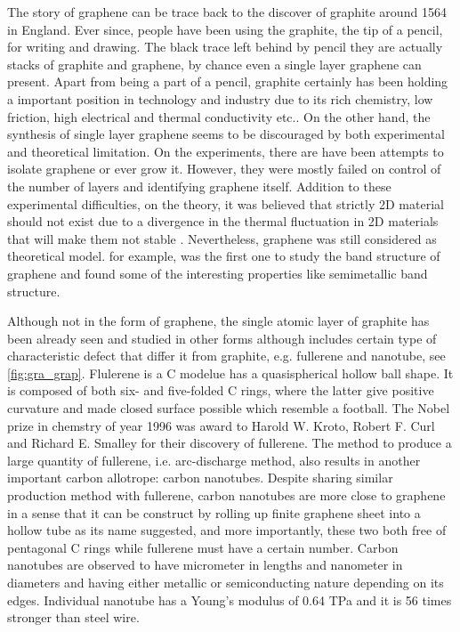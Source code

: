 The story of graphene can be trace back to the discover of graphite around 1564 in England\cite{petroski1990pencil}. Ever since, people have been using the graphite, the tip of a pencil, for writing and drawing. The black trace left behind by pencil they are actually stacks of graphite and graphene, by chance even a single layer graphene can present.  Apart from being a part of a pencil, graphite certainly has been holding a important position in technology and industry due to its rich chemistry, low friction, high electrical and thermal conductivity etc.. On the other hand, the synthesis of single layer graphene seems to be discouraged by both experimental and theoretical limitation. On the experiments, there are have been attempts\cite{Krishnan1997,Ohashi1997,Dresselhaus2002,Shioyama2001} to isolate graphene or ever grow it. However, they were mostly failed on control of the number of layers and identifying graphene itself.  Addition to these experimental difficulties, on the theory, it was believed that strictly 2D material should not exist due to a divergence in the thermal fluctuation in 2D materials that will make them not stable \cite{Peierls1935,Landau1937,Mermin1968}. Nevertheless, graphene was still considered as theoretical model. for example, \citet{Wallace1947} was the first one to study the band structure of graphene \cite{CastroNeto2009} and found some of the interesting properties like semimetallic band structure. 

Although not in the form of graphene, the single atomic layer of graphite has been already seen and studied in other forms although includes certain type of characteristic defect that differ it from graphite, e.g. fullerene and nanotube, see \autoref{fig:gra_grap}. Flulerene is a C modelue has a quasispherical hollow ball shape. It is composed of both six- and five-folded C rings, where the latter give positive curvature and made closed surface possible which resemble a football\cite{Kroto1985,Lamb1990}. The Nobel prize in chemstry of year 1996 was award to Harold W. Kroto, Robert F. Curl and Richard E. Smalley for their discovery of fullerene. The method to produce a large quantity of fullerene, i.e. arc-discharge method\cite{Lamb1990}, also results in another important carbon allotrope: carbon nanotubes\cite{Iijima1993}. Despite sharing similar production method with fullerene, carbon nanotubes are more close to graphene in a sense that it can be construct by rolling up finite graphene sheet into a hollow tube as its name suggested, and more importantly, these two both free of pentagonal C rings while fullerene must have a certain number. Carbon nanotubes are observed to have micrometer in lengths and nanometer in diameters and having either metallic or semiconducting nature depending on its edges. Individual nanotube has a Young's modulus of 0.64 TPa and it is 56 times stronger than steel wire\cite{Baughman787}.


